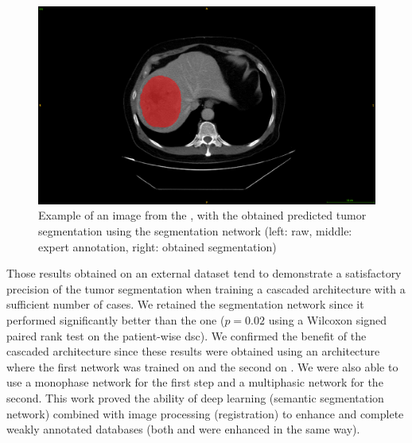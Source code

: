 \begin{figure}
\begin{minipage}{0.3\linewidth}
	\end{minipage} \hspace{0.1cm}
	\begin{minipage}{0.3\linewidth}
		\includegraphics[width=\linewidth]{../HistologicalGradePrediction/images/image7.png}
	\end{minipage}
	\caption{Example of an image from the \textbf{}, with the obtained predicted tumor
	segmentation using the  segmentation network (left: raw,
	middle: expert annotation, right: obtained segmentation)}
	\label{fig:TCIAMultiphaseTumorPred}
\end{figure}


Those results obtained on an external dataset tend to demonstrate a satisfactory precision
of the tumor segmentation when training a cascaded architecture with a
sufficient number of cases.
We retained the  segmentation network since it performed
significantly better than the  one ($ p = 0.02 $ using a Wilcoxon signed
paired rank test on the patient-wise \ac{dsc}).
We confirmed the benefit of the cascaded architecture since these results
were obtained using an architecture where the first network was trained
on \textbf{} and the second on \textbf{}. We were also able to use
a monophase network for the first step and a multiphasic network for the
second.
This work proved the ability of deep learning (semantic segmentation
network) combined with image processing (registration) to enhance and
complete weakly annotated databases (both \textbf{} and \textbf{} were
enhanced in the same way).




